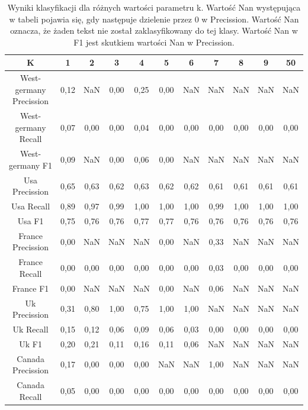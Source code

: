 \documentclass{classrep}
\begin{document}
\newpage
\begin{table}[h!]
\caption{Wyniki klasyfikacji dla różnych wartości parametru k. Wartość Nan występująca w tabeli pojawia się, gdy następuje dzielenie przez 0 w Precission. Wartość Nan oznacza, że żaden tekst nie został zaklasyfikowany do tej klasy. Wartość Nan w F1 jest skutkiem wartości Nan w Precission.}
\centering
\vspace{0.1cm}
 \begin{tabular}{c c c c c c c c c c c}

    \textbf{K} & \textbf{1}   & \textbf{2}  & \textbf{3}  & \textbf{4}  & \textbf{5} & \textbf{6}   & \textbf{7}  & \textbf{8}  & \textbf{9}  & \textbf{50} \\

\hline
West-germany Precission 	& 0,12 & NaN & 0,00 & 0,25 & 0,00 & NaN  & NaN & NaN & NaN  & NaN\\
West-germany Recall 		& 0,07 & 0,00 & 0,00 & 0,04 & 0,00 & 0,00 & 0,00 & 0,00 & 0,00 & 0,00\\
West-germany F1		& 0,09 & NaN & 0,00 & 0,06 & 0,00 & NaN  & NaN & NaN & NaN  & NaN \\
\hline
Usa Precission 			& 0,65 & 0,63 & 0,62 & 0,63 & 0,62 & 0,62 & 0,61 & 0,61 & 0,61 & 0,61 \\
Usa Recall				& 0,89 & 0,97 & 0,99 & 1,00 & 1,00 & 1,00 & 0,99 & 1,00 & 1,00 & 1,00 \\
Usa F1			 	& 0,75 & 0,76 & 0,76 & 0,77 & 0,77 & 0,76 & 0,76 & 0,76 & 0,76 & 0,76 \\
\hline
France Precission 		& 0,00 & NaN & NaN & NaN  & 0,00  & NaN & 0,33 & NaN  & NaN & NaN \\
France Recall 			& 0,00 & 0,00 & 0,00 & 0,00 & 0,00 & 0,00 & 0,03 & 0,00 & 0,00 & 0,00 \\
France F1 				& 0,00 & NaN & NaN & NaN  & 0,00 & NaN & 0,06 & NaN  & NaN & NaN\\
\hline
Uk Precission 			& 0,31 & 0,80 & 1,00 & 0,75 & 1,00  & 1,00 & NaN & NaN  & NaN & NaN\\
Uk Recall 				& 0,15 & 0,12 & 0,06 & 0,09 & 0,06 & 0,03 & 0,00 & 0,00 & 0,00 & 0,00\\
Uk F1 				& 0,20 & 0,21 & 0,11 & 0,16 & 0,11  & 0,06 & NaN & NaN  & NaN & NaN \\
\hline
Canada Precission		& 0,17 & 0,00 & 0,00 & 0,00 & NaN & NaN & 1,00 & NaN  & NaN & NaN\\
Canada Recall 			& 0,05 & 0,00 & 0,00 & 0,00 & 0,00 & 0,00 & 0,00 & 0,00 & 0,00 & 0,00 \\

\end{tabular}
\end{table}
\end{document}
